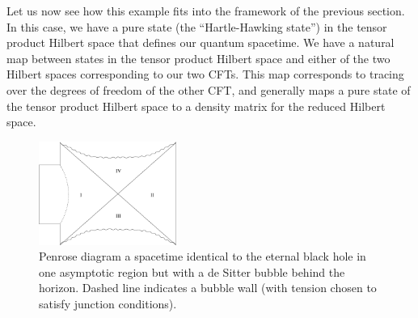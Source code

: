 \documentclass[12pt,epsf]{article}
\renewcommand{\(}{\left(}
\renewcommand{\)}{\right)}
\begin{document}
Let us now see how this example fits into the framework of the previous section. In this case, we have a pure state (the ``Hartle-Hawking state'') in the tensor product Hilbert space that defines our quantum spacetime. We have a natural map between states in the tensor product Hilbert space and either of the two Hilbert spaces corresponding to our two CFTs. This map corresponds to tracing over the degrees of freedom of the other CFT, and generally maps a pure state of the tensor product Hilbert space to a density matrix for the reduced Hilbert space.
\begin{figure}
\centering
\includegraphics[width=0.4\textwidth]{penrose2.eps}
\caption{Penrose diagram a spacetime identical to the eternal black hole in one asymptotic region but with a de Sitter bubble behind the horizon. Dashed line indicates a bubble wall (with tension chosen to satisfy junction conditions).}
\end{figure}
\end{document}
